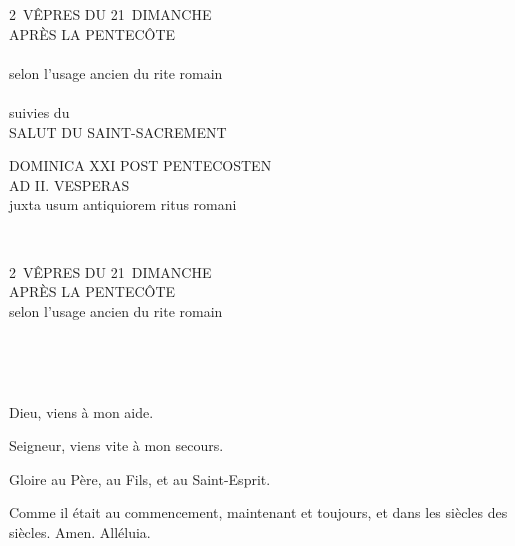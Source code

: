 \documentclass[twoside]{article}
\begin{document}
\null\vfill
\begin{center}\begin{doublespace}
{
\MakeUppercase{\Large 2\iemes~vêpres du 21\ieme~dimanche \\ après la Pentecôte}\\~\\
selon l'usage ancien du rite romain\\~\\
suivies du\\
\MakeUppercase{\Large Salut du Saint-Sacrement}
}
\end{doublespace}\end{center}
\vfill\newpage

\sloppy

\begin{paracol}[1]{2}

\begin{center}\begin{doublespace}

{
\MakeUppercase{\Large Dominica XXI post Pentecosten \\ ad II. Vesperas}\\
juxta usum antiquiorem ritus romani}
\end{doublespace}\end{center}


~~

\switchcolumn

\begin{center}\begin{doublespace}
{
\MakeUppercase{\Large 2\iemes~vêpres du 21\ieme~dimanche \\ après la Pentecôte}\\
selon l'usage ancien du rite romain
}
\end{doublespace}\end{center}

~~

~~

\vv Dieu, viens à mon aide.

\rr Seigneur, viens vite à mon secours.

\vv Gloire au Père, au Fils, et au Saint-Esprit.

\rr Comme il était au commencement, maintenant et toujours, et dans les siècles des siècles. Amen. Alléluia.


\end{paracol}
\end{document}
